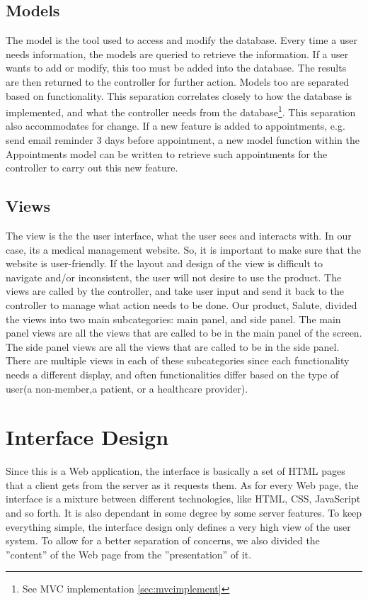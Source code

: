 \documentclass[10pt]{report}
\begin{document}
\subsection{Models}
The model is the tool used to access and modify the database. Every time a user needs information, the models are queried to retrieve the information. If a user wants to add or modify, this too must be added into the database. The results are then returned to the controller for further action.
Models too are separated based on functionality. This separation correlates closely to how the database is implemented, and what the controller needs from the database\footnote{See MVC implementation \ref{sec:mvcimplement}}. This separation also accommodates for change. If a new feature is added to appointments, e.g. send email reminder 3 days before appointment, a new model function within the Appointments model can be written to retrieve such appointments for the controller to carry out this new feature. 

\subsection{Views}
The view is the the user interface, what the user sees and interacts with. In our case, its a medical management website. So, it is important to make sure that the website is user-friendly. If the layout and design of the view is difficult to navigate and/or inconsistent, the user will not desire to use the product. The views are called by the controller, and take user input and send it back to the controller to manage what action needs to be done. 
Our product, Salute, divided the views into two main subcategories: main panel, and side panel. The main panel views are all the views that are called to be in the main panel of the screen. The side panel views are all the views that are called to be in the side panel. There are multiple views in each of these subcategories since each functionality needs a different display, and often functionalities differ based on the type of user(a non-member,a patient, or a healthcare provider). 

\section{Interface Design}
Since this is a Web application, the interface is basically a set of HTML pages that a client gets from the server as it requests them. As for every Web page, the interface is a mixture between different technologies, like HTML, CSS, JavaScript and so forth. It is also dependant in some degree by some server features. To keep everything simple, the interface design only defines a very high view of the user system. To allow for a better separation of concerns, we also divided the ''content'' of the Web page from the ''presentation'' of it.
\end{document}
